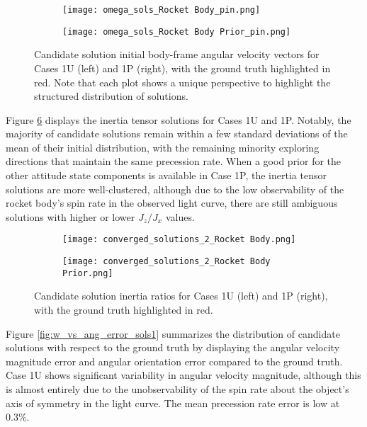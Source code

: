 \documentclass[a4paper,twocolumn]{spaceDebrisC} %
\begin{document}
\begin{figure}[H]
  \centering
  \begin{subfigure}[t]{0.23\textwidth}
    \centering
    \texttt{[image: omega\_sols\_Rocket Body\_pin.png]}
    \caption{}
    \label{fig:omega_sols1U}
  \end{subfigure}
  \hfill
  \begin{subfigure}[t]{0.23\textwidth}
    \centering
    \texttt{[image: omega\_sols\_Rocket Body Prior\_pin.png]}
    \caption{}
    \label{fig:omega_sols1P}
  \end{subfigure}
  \caption{Candidate solution initial body-frame angular velocity vectors for Cases 1U (left) and 1P (right), with the ground truth highlighted in red. Note that each plot shows a unique perspective to highlight the structured distribution of solutions.}
  \label{fig:omega_sols1}
\end{figure}

Figure \ref{fig:i_sols1} displays the inertia tensor solutions for Cases 1U and 1P. Notably, the majority of candidate solutions remain within a few standard deviations of the mean of their initial distribution, with the remaining minority exploring directions that maintain the same precession rate. When a good prior for the other attitude state components is available in Case 1P, the inertia tensor solutions are more well-clustered, although due to the low observability of the rocket body's spin rate in the observed light curve, there are still ambiguous solutions with higher or lower $J_z / J_x$ values.

\begin{figure}[H]
  \centering
  \begin{subfigure}[t]{0.23\textwidth}
    \centering
    \texttt{[image: converged\_solutions\_2\_Rocket Body.png]}
    \caption{}
    \label{fig:i_sols1U}
  \end{subfigure}
  \hfill
  \begin{subfigure}[t]{0.23\textwidth}
    \centering
    \texttt{[image: converged\_solutions\_2\_Rocket Body Prior.png]}
    \caption{}
    \label{fig:i_sols1P}
  \end{subfigure}
  \caption{Candidate solution inertia ratios for Cases 1U (left) and 1P (right), with the ground truth highlighted in red.}
  \label{fig:i_sols1}
\end{figure}

Figure \ref{fig:w_vs_ang_error_sols1} summarizes the distribution of candidate solutions with respect to the ground truth by displaying the angular velocity magnitude error and angular orientation error compared to the ground truth. Case 1U shows significant variability in angular velocity magnitude, although this is almost entirely due to the unobservability of the spin rate about the object's axis of symmetry in the light curve. The mean precession rate error is low at $0.3\%$. 
\end{document}
